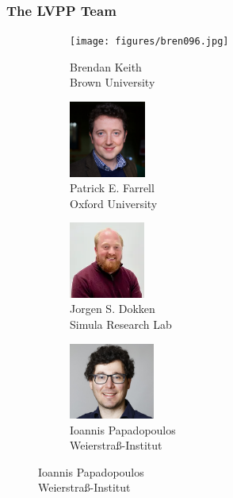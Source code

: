 \documentclass[aspectratio=169,xcolor=dvipsnames,11pt]{beamer}
\begin{document}
\begin{frame}\frametitle{The LVPP Team}
\captionsetup[subfigure]{labelformat=empty}
\begin{figure}
  \begin{subfigure}[b]{2.75cm}
    \texttt{[image: figures/bren096.jpg]}
    \caption{Brendan Keith\\ Brown University}
  \end{subfigure}
  \hfill
  \begin{subfigure}[b]{2.75cm}
    \includegraphics[width=\linewidth,height=2.5cm, keepaspectratio]{figures/patrick.jpg}
    \caption{Patrick E. Farrell\\ Oxford University}
  \end{subfigure}
  \hfill
  \begin{subfigure}[b]{2.75cm}
    \includegraphics[width=\linewidth,height=2.5cm, keepaspectratio]{figures/joergen.png}
    \caption{Jorgen S. Dokken\\ Simula Research Lab}
  \end{subfigure}
   \hfill
  \begin{subfigure}[b]{3.2cm}
    \includegraphics[width=\linewidth,height=2.5cm, keepaspectratio]{figures/papadopoulos.jpg}
    \caption{Ioannis Papadopoulos\\ Weierstra\ss-Institut}
  \end{subfigure}
\hspace{7em}	
\end{figure}\vspace{-4ex}
{\tiny
\begin{thebibliography}{1}


\end{thebibliography}}
\end{frame}
\end{document}
